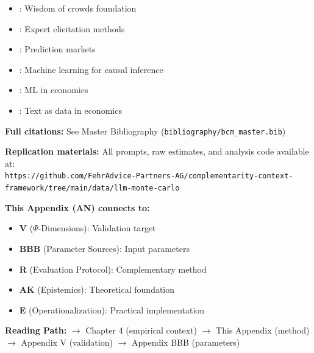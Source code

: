 \begin{itemize}[nosep]
    \item \citet{surowiecki2005wisdom}: Wisdom of crowds foundation
    \item \citet{ohaganelicitation}: Expert elicitation methods
    \item \citet{wolfers2004prediction}: Prediction markets
    \item \citet{atheyimbens2019}: Machine learning for causal inference
    \item \citet{mullainathan2017}: ML in economics
    \item \citet{gentzkow2019}: Text as data in economics
\end{itemize}

\textbf{Full citations:} See Master Bibliography (\texttt{bibliography/bcm\_master.bib})

\textbf{Replication materials:} All prompts, raw estimates, and analysis code available at:\\
\texttt{https://github.com/FehrAdvice-Partners-AG/complementarity-context-framework/tree/main/data/llm-monte-carlo}


\begin{tcolorbox}[colback=gray!10!white, colframe=gray!75!black,
    title=\textbf{Cross-Reference Footer}]
\label{sec:AN-footer}

\textbf{This Appendix (AN) connects to:}
\begin{itemize}[nosep]
    \item \textbf{V} ($\Psi$-Dimensions): Validation target
    \item \textbf{BBB} (Parameter Sources): Input parameters
    \item \textbf{R} (Evaluation Protocol): Complementary method
    \item \textbf{AK} (Epistemics): Theoretical foundation
    \item \textbf{E} (Operationalization): Practical implementation
\end{itemize}

\textbf{Reading Path:}
$\rightarrow$ Chapter 4 (empirical context) $\rightarrow$ This Appendix (method)
$\rightarrow$ Appendix V (validation) $\rightarrow$ Appendix BBB (parameters)

\end{tcolorbox}
